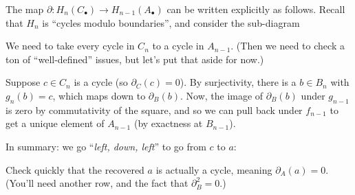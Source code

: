 \begin{remark}
	\label{rem:leftdownleft}
	The map $\partial : H_n(C_\bullet) \to H_{n-1}(A_\bullet)$ can be written explicitly as follows.
	Recall that $H_n$ is ``cycles modulo boundaries'', and consider the sub-diagram
	\begin{center}
	\end{center}
	We need to take every cycle in $C_n$ to a cycle in $A_{n-1}$.
	(Then we need to check a ton of ``well-defined'' issues,
	but let's put that aside for now.)

	Suppose $c \in C_n$ is a cycle (so $\partial_C(c) = 0$).
	By surjectivity, there is a $b \in B_n$ with $g_n(b) = c$,
	which maps down to $\partial_B(b)$.
	Now, the image of $\partial_B(b)$ under $g_{n-1}$ is zero by commutativity of the square,
	and so we can pull back under $f_{n-1}$ to get a unique element of $A_{n-1}$
	(by exactness at $B_{n-1}$).

	In summary: we go ``\emph{left, down, left}'' to go from $c$ to $a$:
	\begin{center}
	\end{center}
\end{remark}
\begin{exercise}
	Check quickly that the recovered $a$ is actually a cycle,
	meaning $\partial_A(a) = 0$.
	(You'll need another row, and the fact that $\partial_B^2 = 0$.)
\end{exercise}

